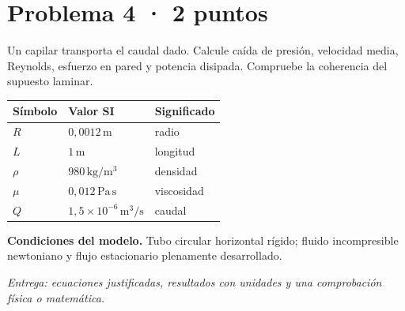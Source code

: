 \par\medskip\noindent\begin{minipage}{\linewidth}

\section{Problema 4 · 2 puntos}

Un capilar transporta el caudal dado. Calcule caída de presión, velocidad media, Reynolds, esfuerzo en pared y potencia disipada. Compruebe la coherencia del supuesto laminar.

\begin{tabular}{@{}p{.15\linewidth}p{.23\linewidth}p{.54\linewidth}@{}}
\toprule Símbolo & Valor SI & Significado\\\midrule
$R$ & $0{,}0012\,\mathrm{m}$ & radio\\
$L$ & $1\,\mathrm{m}$ & longitud\\
$\rho$ & $980\,\mathrm{kg/m^3}$ & densidad\\
$\mu$ & $0{,}012\,\mathrm{Pa\,s}$ & viscosidad\\
$Q$ & $1{,}5\times10^{-6}\,\mathrm{m^3/s}$ & caudal\\
\bottomrule\end{tabular}

\par\medskip\textbf{Condiciones del modelo.} Tubo circular horizontal rígido; fluido incompresible newtoniano y flujo estacionario plenamente desarrollado.

\par\textit{Entrega: ecuaciones justificadas, resultados con unidades y una comprobación física o matemática.}

\end{minipage}\par\medskip

